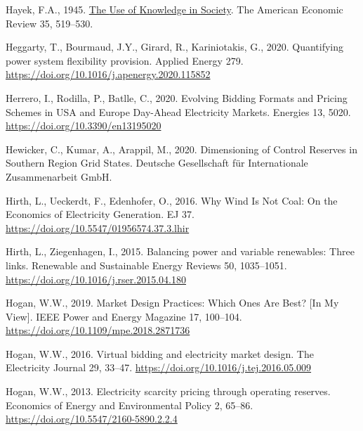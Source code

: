 \documentclass[12pt,a4paper,]{report}
\newlength{\cslhangindent}
\newenvironment{CSLReferences}[2] %
 {%
  \setlength{\parindent}{0pt}
  \ifodd #1 \everypar{\setlength{\hangindent}{\cslhangindent}}\ignorespaces\fi
  \ifnum #2 > 0
  \setlength{\parskip}{#2\baselineskip}
  \fi
 }%
 {}
\begin{document}
\begin{CSLReferences}{1}{0}
\leavevmode{}%
Hayek, F.A., 1945. \href{https://www.jstor.org/stable/1809376}{The {Use}
of {Knowledge} in {Society}}. The American Economic Review 35, 519--530.

\leavevmode{}%
Heggarty, T., Bourmaud, J.Y., Girard, R., Kariniotakis, G., 2020.
Quantifying power system flexibility provision. Applied Energy 279.
\url{https://doi.org/10.1016/j.apenergy.2020.115852}

\leavevmode{}%
Herrero, I., Rodilla, P., Batlle, C., 2020. Evolving {Bidding Formats}
and {Pricing Schemes} in {USA} and {Europe Day-Ahead Electricity
Markets}. Energies 13, 5020. \url{https://doi.org/10.3390/en13195020}

\leavevmode{}%
Hewicker, C., Kumar, A., Arappil, M., 2020. Dimensioning of {Control
Reserves} in {Southern Region Grid States}. {Deutsche Gesellschaft für
Internationale Zusammenarbeit GmbH}.

\leavevmode{}%
Hirth, L., Ueckerdt, F., Edenhofer, O., 2016. Why {Wind Is Not Coal}:
{On} the {Economics} of {Electricity Generation}. EJ 37.
\url{https://doi.org/10.5547/01956574.37.3.lhir}

\leavevmode{}%
Hirth, L., Ziegenhagen, I., 2015. Balancing power and variable
renewables: {Three} links. Renewable and Sustainable Energy Reviews 50,
1035--1051. \url{https://doi.org/10.1016/j.rser.2015.04.180}

\leavevmode{}%
Hogan, W.W., 2019. Market {Design Practices}: {Which Ones Are Best}?
{[}{In My View}{]}. IEEE Power and Energy Magazine 17, 100--104.
\url{https://doi.org/10.1109/mpe.2018.2871736}

\leavevmode{}%
Hogan, W.W., 2016. Virtual bidding and electricity market design. The
Electricity Journal 29, 33--47.
\url{https://doi.org/10.1016/j.tej.2016.05.009}

\leavevmode{}%
Hogan, W.W., 2013. Electricity scarcity pricing through operating
reserves. Economics of Energy and Environmental Policy 2, 65--86.
\url{https://doi.org/10.5547/2160-5890.2.2.4}


\end{CSLReferences}
\end{document}
